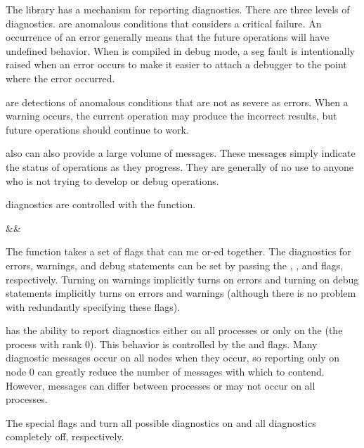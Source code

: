 
The \IceT library has a mechanism for reporting diagnostics.  There are
three levels of diagnostics.   are anomalous
conditions that \IceT considers a critical failure.  An occurrence of an
error generally means that the future \IceT operations will have undefined
behavior.  When \IceT is compiled in debug mode, a seg fault is
intentionally raised when an error occurs to make it easier to attach a
debugger to the point where the error occurred.

 are detections of anomalous conditions
that are not as severe as errors.  When a warning occurs, the current
operation may produce the incorrect results, but future operations should
continue to work.

\IceT also can also provide a large volume of 
messages.  These messages simply indicate the status of \IceT operations as
they progress.  They are generally of no use to anyone who is not trying to
develop or debug \IceT operations.

\IceT diagnostics are controlled with the  function.

\begin{Table}{3}
  \textC{(}&&\quad\textC{);}
\end{Table}

The  function takes a set of flags that can me or-ed
together.  The diagnostics for errors, warnings, and debug statements can
be set by passing the ,
, and  flags, respectively.
Turning on warnings implicitly turns on errors and turning on debug
statements implicitly turns on errors and warnings (although there is no
problem with redundantly specifying these flags).

\IceT has the ability to report diagnostics either on all processes or only
on the  (the process with rank
0).  This behavior is controlled by the  and
 flags.  Many diagnostic messages occur on
all nodes when they occur, so reporting only on node 0 can greatly reduce
the number of messages with which to contend.  However, messages can differ
between processes or may not occur on all processes.

The special flags  and  turn
all possible diagnostics on and all diagnostics completely off,
respectively.

